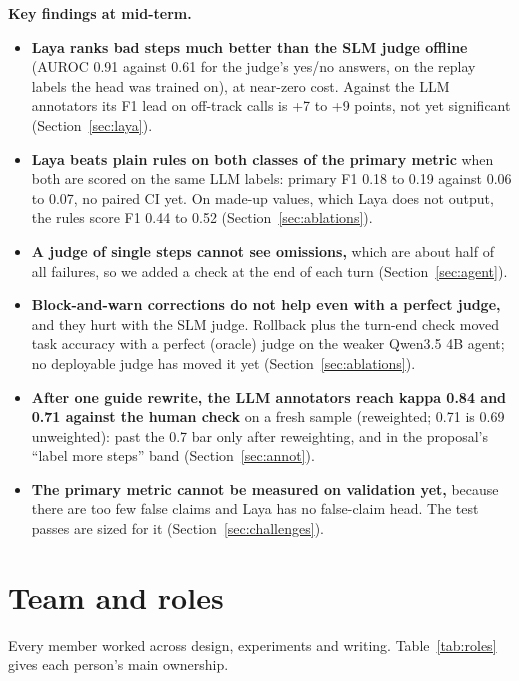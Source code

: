 \documentclass[10.5pt,a4paper]{article}
\begin{document}
\textbf{Key findings at mid-term.}
\begin{itemize}
  \item \textbf{Laya ranks bad steps much better than the SLM judge offline} (AUROC 0.91 against 0.61 for the judge's yes/no answers, on the replay labels the head was trained on), at near-zero cost. Against the LLM annotators its F1 lead on off-track calls is +7 to +9 points, not yet significant (Section~\ref{sec:laya}).
  \item \textbf{Laya beats plain rules on both classes of the primary metric} when both are scored on the same LLM labels: primary F1 0.18 to 0.19 against 0.06 to 0.07, no paired CI yet. On made-up values, which Laya does not output, the rules score F1 0.44 to 0.52 (Section~\ref{sec:ablations}).
  \item \textbf{A judge of single steps cannot see omissions,} which are about half of all failures, so we added a check at the end of each turn (Section~\ref{sec:agent}).
  \item \textbf{Block-and-warn corrections do not help even with a perfect judge,} and they hurt with the SLM judge. Rollback plus the turn-end check moved task accuracy with a perfect (oracle) judge on the weaker Qwen3.5 4B agent; no deployable judge has moved it yet (Section~\ref{sec:ablations}).
  \item \textbf{After one guide rewrite, the LLM annotators reach kappa 0.84 and 0.71 against the human check} on a fresh sample (reweighted; 0.71 is 0.69 unweighted): past the 0.7 bar only after reweighting, and in the proposal's ``label more steps'' band (Section~\ref{sec:annot}).
  \item \textbf{The primary metric cannot be measured on validation yet,} because there are too few false claims and Laya has no false-claim head. The test passes are sized for it (Section~\ref{sec:challenges}).
\end{itemize}

\section{Team and roles}

Every member worked across design, experiments and writing. Table~\ref{tab:roles} gives each person's main ownership.
\end{document}
